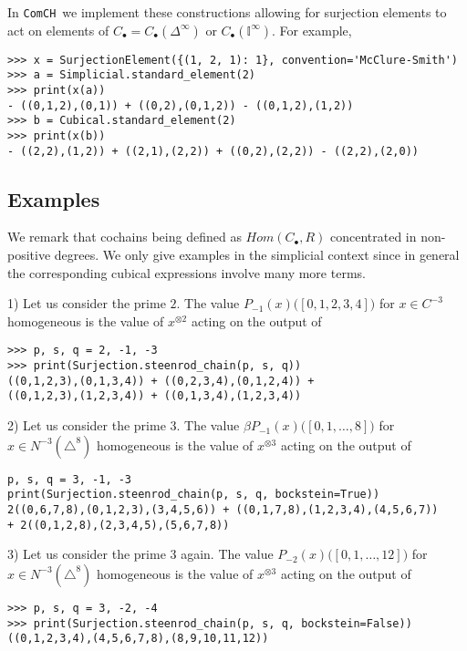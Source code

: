 \documentclass{amsart}
\newcommand{\comch}{\texttt{ComCH}}
\begin{document}
In \comch\, we implement these constructions allowing for surjection elements to act on elements of $C_\bullet = C_\bullet(\Delta^\infty)$ or $C_\bullet(\mathbb I^\infty)$. For example,
\begin{verbatim}
>>> x = SurjectionElement({(1, 2, 1): 1}, convention='McClure-Smith')
>>> a = Simplicial.standard_element(2)
>>> print(x(a))
- ((0,1,2),(0,1)) + ((0,2),(0,1,2)) - ((0,1,2),(1,2))
>>> b = Cubical.standard_element(2)
>>> print(x(b))
- ((2,2),(1,2)) + ((2,1),(2,2)) + ((0,2),(2,2)) - ((2,2),(2,0))
\end{verbatim}

\subsection{Examples}

We remark that cochains being defined as $Hom(C_\bullet, R)$ concentrated in non-positive degrees. We only give examples in the simplicial context since in general the corresponding cubical expressions involve many more terms.

1) Let us consider the prime $2$. The value $P_{-1}(x)\big([0,1,2,3,4]\big)$ for $x \in C^{-3}$ homogeneous is the value of $x^{\otimes 2}$ acting on the output of
\begin{verbatim}
>>> p, s, q = 2, -1, -3
>>> print(Surjection.steenrod_chain(p, s, q))
((0,1,2,3),(0,1,3,4)) + ((0,2,3,4),(0,1,2,4)) +
((0,1,2,3),(1,2,3,4)) + ((0,1,3,4),(1,2,3,4))
\end{verbatim}

2) Let us consider the prime $3$. The value $\beta P_{-1}(x)\big([0,1,\dots,8]\big)$ for $x \in N^{-3}(\triangle^8)$ homogeneous is the value of $x^{\otimes 3}$ acting on the output of
\begin{verbatim}
p, s, q = 3, -1, -3
print(Surjection.steenrod_chain(p, s, q, bockstein=True))
2((0,6,7,8),(0,1,2,3),(3,4,5,6)) + ((0,1,7,8),(1,2,3,4),(4,5,6,7))
+ 2((0,1,2,8),(2,3,4,5),(5,6,7,8))
\end{verbatim}

3) Let us consider the prime $3$ again. The value $P_{-2}(x)\big([0,1,\dots,12]\big)$ for $x \in N^{-3}(\triangle^8)$ homogeneous is the value of $x^{\otimes 3}$ acting on the output of
\begin{verbatim}
>>> p, s, q = 3, -2, -4
>>> print(Surjection.steenrod_chain(p, s, q, bockstein=False))
((0,1,2,3,4),(4,5,6,7,8),(8,9,10,11,12))
\end{verbatim}



\end{document}
